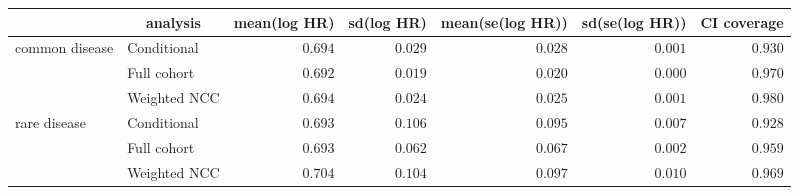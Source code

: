 %
\begin{table}[!tbp]
\begin{center}
\begin{tabular}{llrrrrr}
\toprule
\multicolumn{1}{l}{}&\multicolumn{1}{c}{analysis}&\multicolumn{1}{c}{mean(log HR)}&\multicolumn{1}{c}{sd(log HR)}&\multicolumn{1}{c}{mean(se(log HR))}&\multicolumn{1}{c}{sd(se(log HR))}&\multicolumn{1}{c}{CI coverage}\tabularnewline
\midrule
common disease&Conditional&$0.694$&$0.029$&$0.028$&$0.001$&$0.930$\tabularnewline
&Full cohort&$0.692$&$0.019$&$0.020$&$0.000$&$0.970$\tabularnewline
 &Weighted NCC&$0.694$&$0.024$&$0.025$&$0.001$&$0.980$\tabularnewline
rare disease&Conditional&$0.693$&$0.106$&$0.095$&$0.007$&$0.928$\tabularnewline
  &Full cohort&$0.693$&$0.062$&$0.067$&$0.002$&$0.959$\tabularnewline
   &Weighted NCC&$0.704$&$0.104$&$0.097$&$0.010$&$0.969$\tabularnewline
\bottomrule
\end{tabular}
\end{center}
\end{table}

